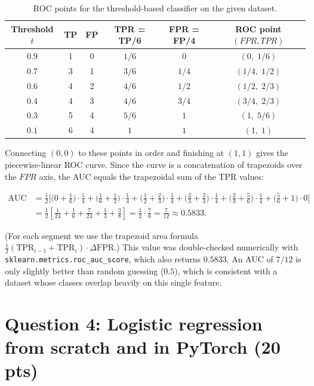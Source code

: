 \documentclass[11pt,a4paper]{article}
\begin{document}
\begin{table}[H]
\centering
\begin{tabular}{cccccc}
\toprule
Threshold $t$ & TP & FP & TPR = TP/6 & FPR = FP/4 & ROC point $(FPR, TPR)$ \\
\midrule
$0.9$ & 1 & 0 & $1/6$  & $0$   & $(0,\; 1/6)$ \\
$0.7$ & 3 & 1 & $3/6$  & $1/4$ & $(1/4,\; 1/2)$ \\
$0.6$ & 4 & 2 & $4/6$  & $1/2$ & $(1/2,\; 2/3)$ \\
$0.4$ & 4 & 3 & $4/6$  & $3/4$ & $(3/4,\; 2/3)$ \\
$0.3$ & 5 & 4 & $5/6$  & $1$   & $(1,\; 5/6)$ \\
$0.1$ & 6 & 4 & $1$    & $1$   & $(1,\; 1)$ \\
\bottomrule
\end{tabular}
\caption{ROC points for the threshold-based classifier on the given dataset.}
\end{table}

Connecting $(0,0)$ to these points in order and finishing at $(1,1)$ gives the
piecewise-linear ROC curve. Since the curve is a concatenation of trapezoids over the
$FPR$ axis, the AUC equals the trapezoidal sum of the TPR values:

\begin{align*}
\mathrm{AUC}
&= \tfrac{1}{2}\Big[\bigl(0+\tfrac{1}{6}\bigr)\cdot\tfrac{1}{4}
 + \bigl(\tfrac16+\tfrac12\bigr)\cdot\tfrac14
 + \bigl(\tfrac12+\tfrac23\bigr)\cdot\tfrac14
 + \bigl(\tfrac23+\tfrac23\bigr)\cdot\tfrac14
 + \bigl(\tfrac23+\tfrac56\bigr)\cdot\tfrac14
 + \bigl(\tfrac56+1\bigr)\cdot0 \Big] \\
&= \frac{1}{2}\left[\frac{1}{24}+\frac{1}{6}+\frac{7}{24}+\frac{1}{3}+\frac{3}{8}\right]
 = \frac{1}{2}\cdot\frac{7}{6}
 = \boxed{\frac{7}{12} \approx 0.5833}.
\end{align*}

(For each segment we use the trapezoid area formula
$\tfrac12(\mathrm{TPR}_{i-1}+\mathrm{TPR}_i)\cdot\Delta\mathrm{FPR}$.) This value was
double-checked numerically with \texttt{sklearn.metrics.roc\_auc\_score}, which also
returns $0.5833$. An AUC of $7/12$ is only slightly better than random guessing
($0.5$), which is consistent with a dataset whose classes overlap heavily on this
single feature.

\section{Question 4: Logistic regression from scratch and in PyTorch (20 pts)}
\end{document}
